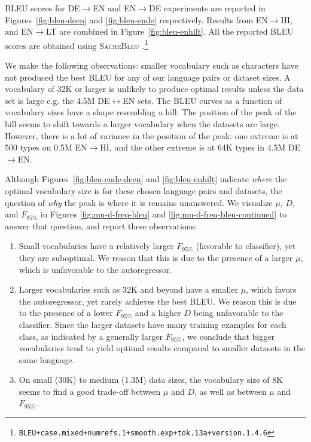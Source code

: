 BLEU scores for DE$\rightarrow$EN and EN$\rightarrow$DE experiments are reported in Figures~\ref{fig:bleu-deen} and \ref{fig:bleu-ende} respectively.
Results from EN$\rightarrow$HI, and EN$\rightarrow$LT are combined in Figure~\ref{fig:bleu-enhilt}.
All the reported BLEU scores are obtained using \textsc{SacreBleu} \cite{post-2018-sacrebleu}.\footnote{\texttt{BLEU+case.mixed+numrefs.1+smooth.exp+tok.13a+version.1.4.6}}

We make the following observations: smaller vocabulary such as characters have not produced the best BLEU for any of our language pairs or dataset sizes. 
A vocabulary of 32K or larger is unlikely to produce optimal results unless the data set is large e.g. the 4.5M DE$\leftrightarrow$EN sets.
The BLEU curves as a function of vocabulary sizes have a shape resembling a hill. 
The position of the peak of the hill seems to shift towards a larger vocabulary when the datasets are large. 
However, there is a lot of variance in the position of the peak: one extreme is at 500 types on 0.5M EN$\rightarrow$HI, and the other extreme is at 64K types in 4.5M DE$\rightarrow$EN. 
    
Although Figures~\ref{fig:bleu-ende-deen} and \ref{fig:bleu-enhilt} indicate \textit{where} the optimal vocabulary size is for these chosen language pairs and datasets, the question of \textit{why} the peak is where it is remains unanswered.
We visualize $\mu$, $D$, and $F_{95\%}$ in Figures \ref{fig:mu-d-freq-bleu} and \ref{fig:mu-d-freq-bleu-continued} to answer that question, and report these observations:
\begin{enumerate}
    \itemsep0em 
    \item Small vocabularies have a relatively larger $F_{95\%}$ (favorable to classifier), yet they are suboptimal. We reason that this is due to the presence of a larger $\mu$, which is unfavorable to the autoregressor.
    \item Larger vocabularies such as 32K and beyond have a smaller $\mu$, which favors the autoregressor, yet rarely achieves the best BLEU.
    We reason this is due to the presence of a lower $F_{95\%}$ and a higher $D$ being unfavorable to the classifier.
    Since the larger datasets have many training examples for each class, as indicated by a generally larger $F_{95\%}$, we conclude that bigger vocabularies tend to yield optimal results compared to smaller datasets in the same language.
    
    \item On small (30K) to medium (1.3M) data sizes, the vocabulary size of 8K seems to find a good trade-off between $\mu$ and $D$, as well as between $\mu$ and $F_{95\%}$.
\end{enumerate}

